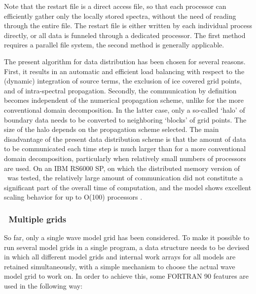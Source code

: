 \noindent
Note that the restart file is a direct access file, so that each processor can
efficiently gather only the locally stored spectra, without the need of
reading through the entire file. The restart file is either written by each
individual process directly, or all data is funneled through a dedicated
processor. The first method requires a parallel file system, the second method
is generally applicable. 

The present algorithm for data distribution has been chosen for several
reasons. First, it results in an automatic and efficient load balancing with
respect to the (dynamic) integration of source terms, the exclusion of ice
covered grid points, and of intra-spectral propagation. Secondly, the
communication by definition becomes independent of the numerical propagation
scheme, unlike for the more conventional domain decomposition. In the latter
case, only a so-called `halo' of boundary data needs to be converted to
neighboring `blocks' of grid points. The size of the halo depends on the
propagation scheme selected. The main disadvantage of the present data
distribution scheme is that the amount of data to be communicated each time
step is much larger than for a more conventional domain decomposition,
particularly when relatively small numbers of processors are used. On an IBM
RS6000 SP, on which the distributed memory version of \ws\ was tested, the
relatively large amount of communication did not constitute a significant part
of the overall time of computation, and the model shows excellent scaling
behavior for up to O(100) processors \citep{tol:PACO02}.


\vsssub
\subsubsection{~Multiple grids} \label{sec:mgrids}
\vsssub

So far, only a single wave model grid has been considered.  To make it
possible to run several model grids in a single program, a data structure
needs to be devised in which all different model grids and internal work
arrays for all models are retained simultaneously, with a simple mechanism to
choose the actual wave model grid to work on. In order to achieve this, some
FORTRAN 90 features \citep[e.g.,][]{bk:MR99} are used in the following way:


